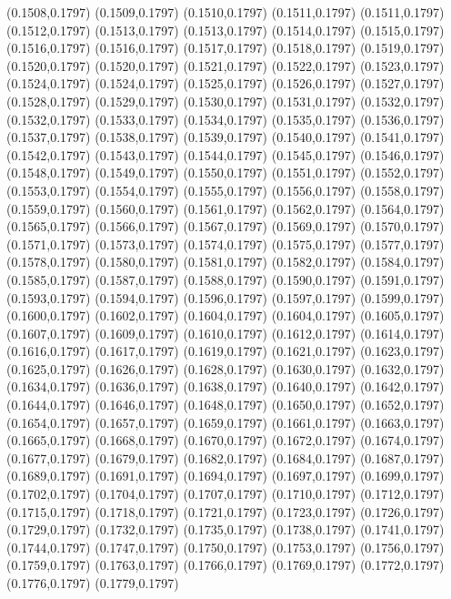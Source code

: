 (0.1508,0.1797)
(0.1509,0.1797)
(0.1510,0.1797)
(0.1511,0.1797)
(0.1511,0.1797)
(0.1512,0.1797)
(0.1513,0.1797)
(0.1513,0.1797)
(0.1514,0.1797)
(0.1515,0.1797)
(0.1516,0.1797)
(0.1516,0.1797)
(0.1517,0.1797)
(0.1518,0.1797)
(0.1519,0.1797)
(0.1520,0.1797)
(0.1520,0.1797)
(0.1521,0.1797)
(0.1522,0.1797)
(0.1523,0.1797)
(0.1524,0.1797)
(0.1524,0.1797)
(0.1525,0.1797)
(0.1526,0.1797)
(0.1527,0.1797)
(0.1528,0.1797)
(0.1529,0.1797)
(0.1530,0.1797)
(0.1531,0.1797)
(0.1532,0.1797)
(0.1532,0.1797)
(0.1533,0.1797)
(0.1534,0.1797)
(0.1535,0.1797)
(0.1536,0.1797)
(0.1537,0.1797)
(0.1538,0.1797)
(0.1539,0.1797)
(0.1540,0.1797)
(0.1541,0.1797)
(0.1542,0.1797)
(0.1543,0.1797)
(0.1544,0.1797)
(0.1545,0.1797)
(0.1546,0.1797)
(0.1548,0.1797)
(0.1549,0.1797)
(0.1550,0.1797)
(0.1551,0.1797)
(0.1552,0.1797)
(0.1553,0.1797)
(0.1554,0.1797)
(0.1555,0.1797)
(0.1556,0.1797)
(0.1558,0.1797)
(0.1559,0.1797)
(0.1560,0.1797)
(0.1561,0.1797)
(0.1562,0.1797)
(0.1564,0.1797)
(0.1565,0.1797)
(0.1566,0.1797)
(0.1567,0.1797)
(0.1569,0.1797)
(0.1570,0.1797)
(0.1571,0.1797)
(0.1573,0.1797)
(0.1574,0.1797)
(0.1575,0.1797)
(0.1577,0.1797)
(0.1578,0.1797)
(0.1580,0.1797)
(0.1581,0.1797)
(0.1582,0.1797)
(0.1584,0.1797)
(0.1585,0.1797)
(0.1587,0.1797)
(0.1588,0.1797)
(0.1590,0.1797)
(0.1591,0.1797)
(0.1593,0.1797)
(0.1594,0.1797)
(0.1596,0.1797)
(0.1597,0.1797)
(0.1599,0.1797)
(0.1600,0.1797)
(0.1602,0.1797)
(0.1604,0.1797)
\PST@Solid(0.1604,0.1797)
(0.1605,0.1797)
(0.1607,0.1797)
(0.1609,0.1797)
(0.1610,0.1797)
(0.1612,0.1797)
(0.1614,0.1797)
(0.1616,0.1797)
(0.1617,0.1797)
(0.1619,0.1797)
(0.1621,0.1797)
(0.1623,0.1797)
(0.1625,0.1797)
(0.1626,0.1797)
(0.1628,0.1797)
(0.1630,0.1797)
(0.1632,0.1797)
(0.1634,0.1797)
(0.1636,0.1797)
(0.1638,0.1797)
(0.1640,0.1797)
(0.1642,0.1797)
(0.1644,0.1797)
(0.1646,0.1797)
(0.1648,0.1797)
(0.1650,0.1797)
(0.1652,0.1797)
(0.1654,0.1797)
(0.1657,0.1797)
(0.1659,0.1797)
(0.1661,0.1797)
(0.1663,0.1797)
(0.1665,0.1797)
(0.1668,0.1797)
(0.1670,0.1797)
(0.1672,0.1797)
(0.1674,0.1797)
(0.1677,0.1797)
(0.1679,0.1797)
(0.1682,0.1797)
(0.1684,0.1797)
(0.1687,0.1797)
(0.1689,0.1797)
(0.1691,0.1797)
(0.1694,0.1797)
(0.1697,0.1797)
(0.1699,0.1797)
(0.1702,0.1797)
(0.1704,0.1797)
(0.1707,0.1797)
(0.1710,0.1797)
(0.1712,0.1797)
(0.1715,0.1797)
(0.1718,0.1797)
(0.1721,0.1797)
(0.1723,0.1797)
(0.1726,0.1797)
(0.1729,0.1797)
(0.1732,0.1797)
(0.1735,0.1797)
(0.1738,0.1797)
(0.1741,0.1797)
(0.1744,0.1797)
(0.1747,0.1797)
(0.1750,0.1797)
(0.1753,0.1797)
(0.1756,0.1797)
(0.1759,0.1797)
(0.1763,0.1797)
(0.1766,0.1797)
(0.1769,0.1797)
(0.1772,0.1797)
(0.1776,0.1797)
(0.1779,0.1797)
